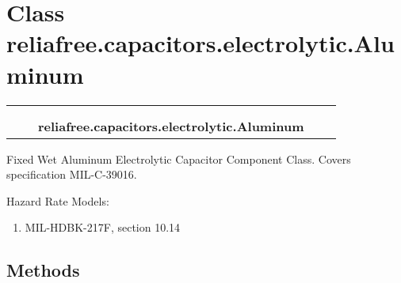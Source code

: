 %
%
%


\section{Class reliafree.capacitors.electrolytic.Aluminum}

    \label{reliafree:capacitors:electrolytic:Aluminum}
\begin{tabular}{cccccc}
\multicolumn{2}{r}{\settowidth{\BCL}{reliafree.capacitors.capacitor.Capacitor}\multirow{2}{\BCL}{reliafree.capacitors.capacitor.Capacitor}}
&&
  \\\cline{3-3}
  &&\multicolumn{1}{c|}{}
&&
  \\
&&\multicolumn{2}{l}{\textbf{reliafree.capacitors.electrolytic.Aluminum}}
\end{tabular}

Fixed Wet Aluminum Electrolytic Capacitor Component Class. Covers 
specification MIL-C-39016.

Hazard Rate Models:

\begin{enumerate}

\setlength{\parskip}{0.5ex}
  \item MIL-HDBK-217F, section 10.14

\end{enumerate}



  \subsection{Methods}

    \vspace{0.5ex}

